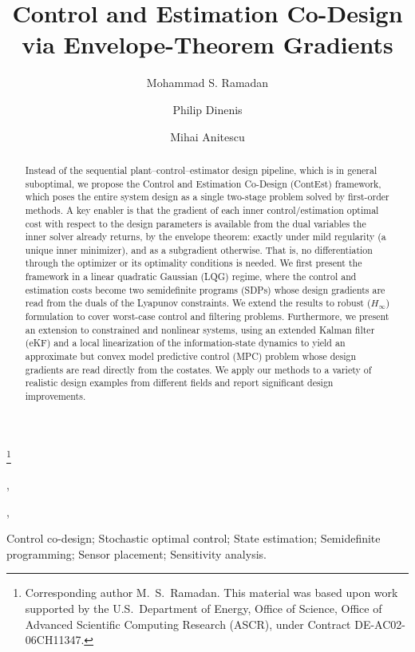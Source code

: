 \documentclass[twocolumn,amsthm]{autart}
\begin{document}
\begin{frontmatter}

\title{Control and Estimation Co-Design via Envelope-Theorem Gradients}

 \thanks[footnoteinfo]{Corresponding author M.~S.~Ramadan. This material was
 based upon work supported by the U.S.\ Department of Energy, Office of Science,
 Office of Advanced Scientific Computing Research (ASCR), under Contract
 DE-AC02-06CH11347.}

\author[anl]{Mohammad S. Ramadan},
\author[anl]{Philip Dinenis},
\author[anl]{Mihai Anitescu}

\address[anl]{Mathematics and Computer Science Division, Argonne National
Laboratory, Lemont, IL 60439, USA}

\begin{keyword}
Control co-design; Stochastic optimal control; State estimation;
Semidefinite programming; Sensor placement; Sensitivity analysis.
\end{keyword}

\begin{abstract}
Instead of the sequential plant--control--estimator design pipeline, which is in general suboptimal,
we propose the Control and Estimation Co-Design (ContEst) framework, which poses the entire system design as a single two-stage problem solved by first-order methods. A key
enabler is that the gradient of each inner control/estimation optimal cost with
respect to the design parameters is available from the dual variables
the inner solver already returns, by the envelope theorem: exactly under mild
regularity (a unique inner minimizer), and as a subgradient otherwise. That is, no differentiation
through the optimizer or its optimality conditions is needed. We first present the
framework in a linear quadratic Gaussian (LQG) regime, where the control and
estimation costs become two semidefinite programs (SDPs) whose design gradients are
read from the duals of the Lyapunov constraints. We extend the results to robust ($H_\infty$)
formulation to cover worst-case control and filtering problems. Furthermore, we present an extension to constrained and nonlinear systems, using an extended Kalman filter (eKF) and a local linearization of the information-state dynamics to yield an approximate but convex model predictive control (MPC) problem whose design gradients are read directly from the costates. We apply our methods to a variety of realistic design examples from different fields and report significant design improvements.
\end{abstract}

\end{frontmatter}
\end{document}
